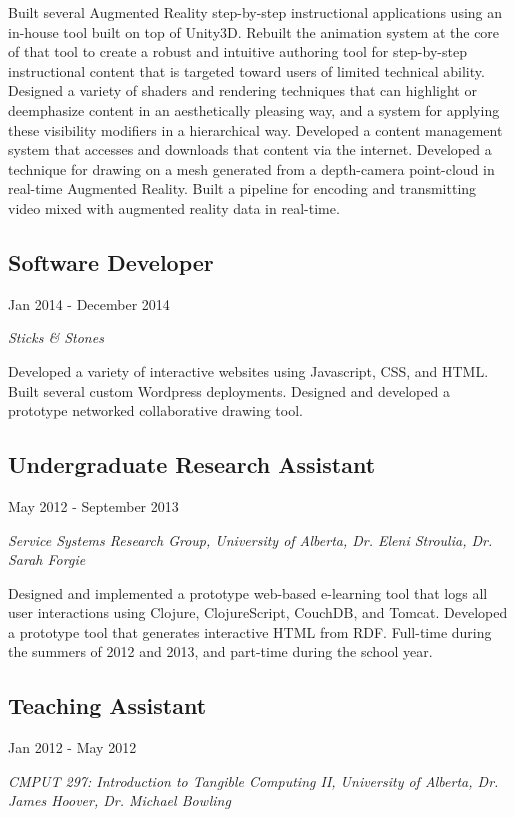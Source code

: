 \documentclass[10pt]{article}
\begin{document}
Built several Augmented Reality step-by-step instructional applications using an in-house tool built on top of Unity3D. Rebuilt the animation system at the core of that tool to create a robust and intuitive authoring tool for step-by-step instructional content that is targeted toward users of limited technical ability. Designed a variety of shaders and rendering techniques that can highlight or deemphasize content in an aesthetically pleasing way, and a system for applying these visibility modifiers in a hierarchical way. Developed a content management system that accesses and downloads that content via the internet. Developed a technique for drawing on a mesh generated from a depth-camera point-cloud in real-time Augmented Reality. Built a pipeline for encoding and transmitting video mixed with augmented reality data in real-time.

\subsection*{Software Developer}
Jan 2014 - December 2014

\emph{Sticks \& Stones}
\vspace{\baselineskip}

Developed a variety of interactive websites using Javascript, CSS, and HTML. Built several custom Wordpress deployments. Designed and developed a prototype networked collaborative drawing tool.

\subsection*{Undergraduate Research Assistant}
May 2012 - September 2013

\emph{Service Systems Research Group, University of Alberta, Dr. Eleni Stroulia, Dr. Sarah Forgie}
\vspace{\baselineskip}

Designed and implemented a prototype web-based e-learning tool that logs all user interactions using Clojure, ClojureScript, CouchDB, and Tomcat. Developed a prototype tool that generates interactive HTML from RDF. Full-time during the summers of 2012 and 2013, and part-time during the school year.

\subsection*{Teaching Assistant}
Jan 2012 - May 2012

\emph{CMPUT 297: Introduction to Tangible Computing II, University of Alberta, Dr. James Hoover, Dr. Michael Bowling}
\vspace{\baselineskip}
\end{document}
